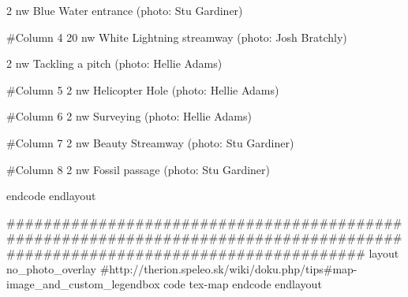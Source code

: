 {       {2} {nw} {
	\legendwidth=30cm\hsize=30cm\size[30]\vskip0.2cm
        Blue Water entrance (photo: Stu Gardiner)
        } 

#Column 4
       {20} {nw} {
	\legendwidth=30cm\hsize=30cm\size[30]\vskip0.2cm
	White Lightning streamway (photo: Josh Bratchly)
        } 

       {2} {nw} {
	\legendwidth=30cm\hsize=30cm\size[30]\vskip0.2cm
        Tackling a pitch (photo: Hellie Adams)
        } 

#Column 5
       {2} {nw} {
	\legendwidth=30cm\hsize=30cm\size[30]\vskip0.2cm
        Helicopter Hole (photo: Hellie Adams)
	} 


#Column 6
       {2} {nw} {
	\legendwidth=30cm\hsize=30cm\size[30]\vskip0.2cm
        Surveying (photo: Hellie Adams)
	} 


#Column 7
       {2} {nw} {
	\legendwidth=30cm\hsize=30cm\size[30]\vskip0.2cm
        Beauty Streamway (photo: Stu Gardiner)
	} 


#Column 8
       {2} {nw} {
	\legendwidth=30cm\hsize=30cm\size[30]\vskip0.2cm
        Fossil passage (photo: Stu Gardiner)
	} 
           


    }	
  endcode
endlayout

#############################################################################################################################
layout no_photo_overlay
  #http://therion.speleo.sk/wiki/doku.php/tips#map-image_and_custom_legendbox
  code tex-map
    \def\maplayout{
      \legendbox{75}{95}{NW}{
        \legendwidth 70 cm
        \the\legendcontent
        }
      \legendbox{1}{55}{NW}{
        \legendwidth 150 cm
        \legendtextsize={\size[30]}
        \hsize=\legendwidth
        
      }
    }	
  endcode
endlayout

